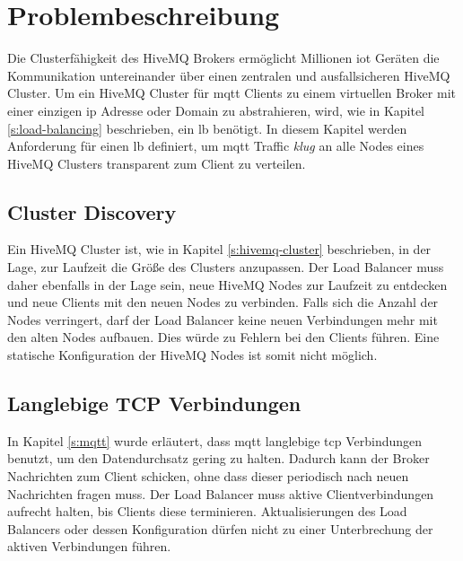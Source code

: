 \section{Problembeschreibung} \label{s:problem}
Die Clusterfähigkeit des HiveMQ Brokers ermöglicht Millionen \ac{iot} Geräten die Kommunikation untereinander über einen zentralen und ausfallsicheren HiveMQ Cluster.
Um ein HiveMQ Cluster für \ac{mqtt} Clients zu einem virtuellen Broker mit einer einzigen \ac{ip} Adresse oder Domain zu abstrahieren, wird, wie in Kapitel \ref{s:load-balancing} beschrieben, ein \acl{lb} benötigt.
In diesem Kapitel werden Anforderung für einen \acl{lb} definiert, um \ac{mqtt} Traffic \textit{klug} an alle Nodes eines HiveMQ Clusters transparent zum Client zu verteilen.

\subsection{Cluster Discovery} \label{sp:cluster-discovery}
Ein HiveMQ Cluster ist, wie in Kapitel \ref{s:hivemq-cluster} beschrieben, in der Lage, zur Laufzeit die Grö{\ss}e des Clusters anzupassen. Der Load Balancer muss daher ebenfalls in der Lage sein, neue HiveMQ Nodes zur Laufzeit zu entdecken und neue Clients mit den neuen Nodes zu verbinden. Falls sich die Anzahl der Nodes verringert, darf der Load Balancer keine neuen Verbindungen mehr mit den alten Nodes aufbauen. Dies würde zu Fehlern bei den Clients führen.
Eine statische Konfiguration der HiveMQ Nodes ist somit nicht möglich.

\subsection{Langlebige TCP Verbindungen}
In Kapitel \ref{s:mqtt} wurde erläutert, dass \ac{mqtt} langlebige \ac{tcp} Verbindungen benutzt, um den Datendurchsatz gering zu halten. Dadurch kann der Broker Nachrichten zum Client schicken, ohne dass dieser periodisch nach neuen Nachrichten fragen muss.
Der Load Balancer muss aktive Clientverbindungen aufrecht halten, bis Clients diese terminieren.
Aktualisierungen des Load Balancers oder dessen Konfiguration dürfen nicht zu einer Unterbrechung der aktiven Verbindungen führen.

